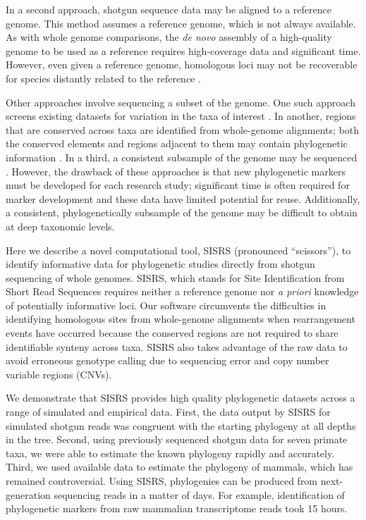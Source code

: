 \documentclass[11pt, oneside]{article}   	%
\begin{document}
In a second approach, shotgun sequence data may be aligned to a reference genome.
This method assumes a reference genome, which is not always available.
As with whole genome comparisons, the \textit{de novo} assembly of a high-quality genome to be used as a reference requires high-coverage data and significant time.
However, even given a reference genome, homologous loci may not be recoverable for species distantly related to the reference \citep{Bertels2014}.

Other approaches involve sequencing a subset of the genome.
One such approach screens existing datasets for variation in the taxa of interest \citep[e.g.][]{ONeill2013, Senn2013, Steele2008}.
In another, regions that are conserved across taxa are identified from whole-genome alignments; both the conserved elements and regions adjacent to them may contain phylogenetic information \citep[e.g.][] {Crawford2012,Faircloth2012,McCormack2012,Lemmon2012}. 
In a third, a consistent subsample of the genome may be sequenced \citep[e.g.\ using RADseq;][]{Eaton2013}.
However, the drawback of these approaches is that new phylogenetic markers must be developed for each research study; significant time is often required for marker development and these data have limited potential for reuse. 
Additionally, a consistent, phylogenetically subsample of the genome may be difficult to obtain at deep taxonomic levels.

Here we describe a novel computational tool, SISRS (pronounced ``scissors''), to identify informative data for phylogenetic studies directly from shotgun sequencing of whole genomes. 
SISRS, which stands for Site Identification from Short Read Sequences requires neither a reference genome nor \textit{a priori} knowledge of potentially informative loci. 
Our software circumvents the difficulties in identifying homologous sites from whole-genome alignments when rearrangement events have occurred because the conserved regions are not required to share identifiable synteny across taxa. 
SISRS also takes advantage of the raw data to avoid erroneous genotype calling due to sequencing error and copy number variable regions (CNVs). 

We demonstrate that SISRS provides high quality phylogenetic datasets across a range of simulated and empirical data. 
First, the data output by SISRS for simulated shotgun reads was congruent with the starting phylogeny at all depths in the tree. 
Second, using previously sequenced shotgun data for seven primate taxa, we were able to estimate the known phylogeny rapidly and accurately. 
Third, we used available data to estimate the phylogeny of mammals, which has remained controversial.
Using SISRS, phylogenies can be produced from next-generation sequencing reads in a matter of days.
For example, identification of phylogenetic markers from raw mammalian transcriptome reads took 15 hours.
\end{document}

